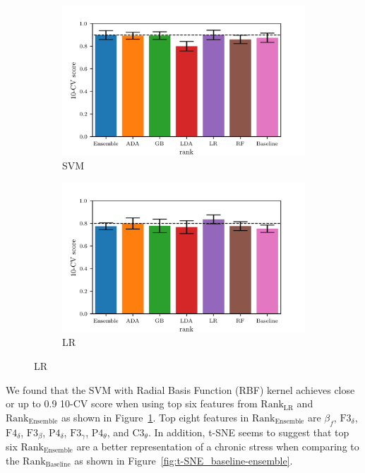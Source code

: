 \documentclass[pdflatex,sn-mathphys]{sn-jnl}%
\theoremstyle{thmstyleone}%
\theoremstyle{thmstyletwo}%
\theoremstyle{thmstylethree}%
\begin{document}
\begin{figure}[h!]
    \begin{subfigure}[b]{0.49\textwidth}
        \centering
        \includegraphics[width=\textwidth]{figures/bar_svm_at_6.png}
        \caption{SVM}
        \label{fig:cv_svm}
    \end{subfigure}
    \hfill
    \begin{subfigure}[b]{0.49\textwidth}
        \centering
        \includegraphics[width=\textwidth]{figures/bar_lr_at_9.png}
        \caption{LR}
    \end{subfigure}
\end{figure}

We found that the SVM with Radial Basis Function (RBF) kernel achieves close or up to 0.9 10-CV score when using top six features from $\text{Rank}_{\text{LR}}$ and $\text{Rank}_{\text{Ensemble}}$ as shown in Figure~\ref{fig:cv_svm}. Top eight features in $\text{Rank}_{\text{Ensemble}}$ are $\beta_{f}$, $\text{F3}_{\delta}$, $\text{F4}_{\delta}$, $\text{F3}_{\beta}$, $\text{P4}_{\delta}$, $\text{F3}_{\gamma}$, $\text{P4}_{\theta}$, and $\text{C3}_{\theta}$. In addition, t-SNE seems to suggest that top six $\text{Rank}_{\text{Ensemble}}$ are a better representation of a chronic stress when comparing to the $\text{Rank}_{\text{Baseline}}$ as shown in Figure~\ref{fig:t-SNE_baseline-ensemble}.
\end{document}
